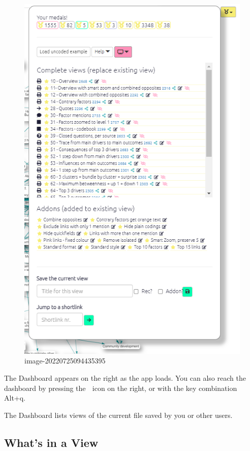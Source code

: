 \documentclass[
]{book}
\begin{document}
\begin{figure}
\centering
\includegraphics{_assets/image-20220725094435395.png}
\caption{image-20220725094435395}
\end{figure}

The Dashboard appears on the right as the app loads. You can also reach the dashboard by pressing the 🏅 icon on the right, or with the key combination Alt+q.

The Dashboard lists views of the current file saved by you or other users.

\hypertarget{whats-in-a-view}{%
\subsection{What's in a View}\label{whats-in-a-view}}
\end{document}
